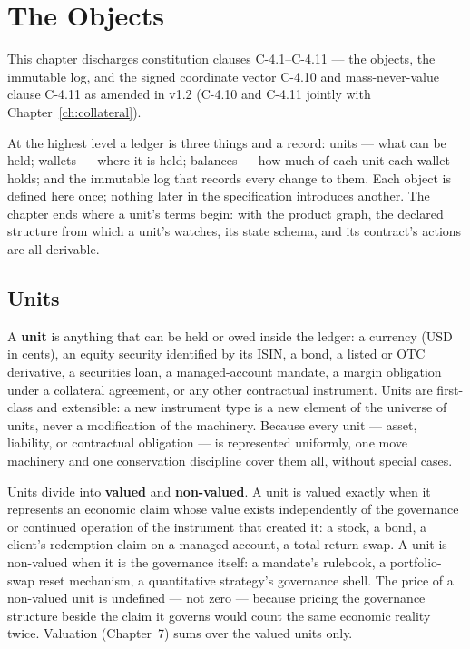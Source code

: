 \section{The Objects}\label{ch:objects}

This chapter discharges constitution clauses C-4.1--C-4.11 --- the objects, the immutable log, and the signed coordinate vector C-4.10 and mass-never-value clause C-4.11 as amended in v1.2 (C-4.10 and C-4.11 jointly with Chapter~\ref{ch:collateral}).

At the highest level a ledger is three things and a record: units --- what can be held;
wallets --- where it is held; balances --- how much of each unit each wallet holds; and
the immutable log that records every change to them. Each object is defined here once;
nothing later in the specification introduces another. The chapter ends where a unit's
terms begin: with the product graph, the declared structure from which a unit's watches,
its state schema, and its contract's actions are all derivable.

\subsection{Units}

A \textbf{unit} is anything that can be held or owed inside the ledger: a currency (USD
in cents), an equity security identified by its ISIN, a bond, a listed or OTC derivative,
a securities loan, a managed-account mandate, a margin obligation under a collateral
agreement, or any other contractual instrument. Units are first-class and extensible: a
new instrument type is a new element of the universe of units, never a modification of
the machinery. Because every unit --- asset, liability, or contractual obligation --- is
represented uniformly, one move machinery and one conservation discipline cover them all,
without special cases.

Units divide into \textbf{valued} and \textbf{non-valued}. A unit is valued exactly when
it represents an economic claim whose value exists independently of the governance or
continued operation of the instrument that created it: a stock, a bond, a client's
redemption claim on a managed account, a total return swap. A unit is non-valued when it
is the governance itself: a mandate's rulebook, a portfolio-swap reset mechanism, a
quantitative strategy's governance shell. The price of a non-valued unit is undefined ---
not zero --- because pricing the governance structure beside the claim it governs would
count the same economic reality twice. Valuation (Chapter~7) sums over the valued units
only.

